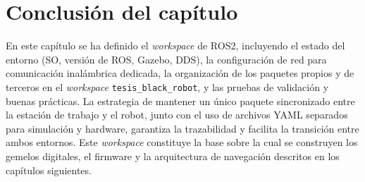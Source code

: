 \section*{Conclusión del capítulo}

En este capítulo se ha definido el \textit{workspace} de \gls{ROS2}, incluyendo el estado del entorno (SO, versión de ROS, Gazebo, DDS), la configuración de red para comunicación inalámbrica dedicada, la organización de los paquetes propios y de terceros en el \textit{workspace} \texttt{tesis\_black\_robot}, y las pruebas de validación y buenas prácticas. La estrategia de mantener un único paquete sincronizado entre la estación de trabajo y el robot, junto con el uso de archivos YAML separados para simulación y hardware, garantiza la trazabilidad y facilita la transición entre ambos entornos. Este \textit{workspace} constituye la base sobre la cual se construyen los gemelos digitales, el firmware y la arquitectura de navegación descritos en los capítulos siguientes.